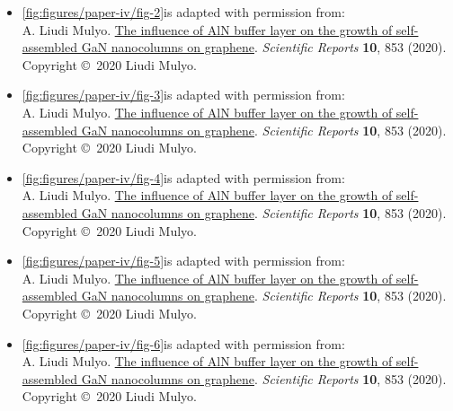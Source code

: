\begin{itemize} [wide=0em, leftmargin=*, label=]
    \item \ref{fig:figures/paper-iv/fig-2}is adapted with permission from: \\ A. Liudi Mulyo. \href{https://www.nature.com/articles/s41598-019-55424-z}{The influence of AlN buffer layer on the growth of self-assembled GaN nanocolumns on graphene}. \textit{Scientific Reports} \textbf{10}, 853 (2020). \\ Copyright \copyright \ 2020 Liudi Mulyo.
    
    \item \ref{fig:figures/paper-iv/fig-3}is adapted with permission from: \\ A. Liudi Mulyo. \href{https://www.nature.com/articles/s41598-019-55424-z}{The influence of AlN buffer layer on the growth of self-assembled GaN nanocolumns on graphene}. \textit{Scientific Reports} \textbf{10}, 853 (2020). \\ Copyright \copyright \ 2020 Liudi Mulyo.
    
    \item \ref{fig:figures/paper-iv/fig-4}is adapted with permission from: \\ A. Liudi Mulyo. \href{https://www.nature.com/articles/s41598-019-55424-z}{The influence of AlN buffer layer on the growth of self-assembled GaN nanocolumns on graphene}. \textit{Scientific Reports} \textbf{10}, 853 (2020). \\ Copyright \copyright \ 2020 Liudi Mulyo.

    \item \ref{fig:figures/paper-iv/fig-5}is adapted with permission from: \\ A. Liudi Mulyo. \href{https://www.nature.com/articles/s41598-019-55424-z}{The influence of AlN buffer layer on the growth of self-assembled GaN nanocolumns on graphene}. \textit{Scientific Reports} \textbf{10}, 853 (2020). \\ Copyright \copyright \ 2020 Liudi Mulyo.

    \item \ref{fig:figures/paper-iv/fig-6}is adapted with permission from: \\ A. Liudi Mulyo. \href{https://www.nature.com/articles/s41598-019-55424-z}{The influence of AlN buffer layer on the growth of self-assembled GaN nanocolumns on graphene}. \textit{Scientific Reports} \textbf{10}, 853 (2020). \\ Copyright \copyright \ 2020 Liudi Mulyo.


\end{itemize}
